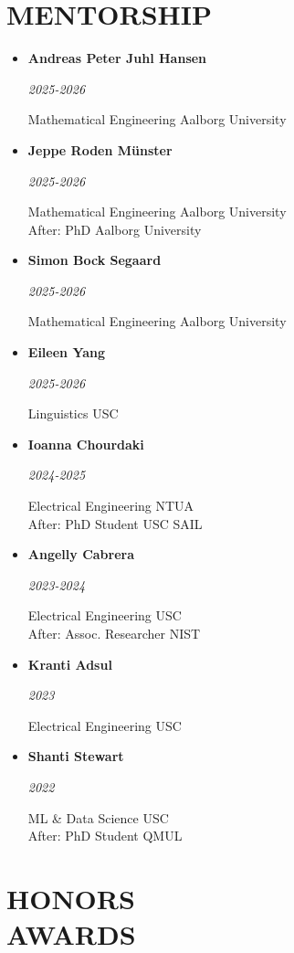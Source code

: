 \documentclass[margin]{res}
\newcommand{\cvheading}[2]{%
  \par\Needspace{4\baselineskip}\noindent
  \parbox[t]{\dimexpr\linewidth-110pt\relax}{\raggedright\bfseries #1}%
  \hfill\parbox[t]{98pt}{\raggedleft\itshape #2}%
  \par\nopagebreak[4]\vspace{-\parskip}\noindent\ignorespaces}
\begin{document}
\begin{resume}
\section{MENTORSHIP}

\begin{itemize}[leftmargin=*]
    \item \cvheading{Andreas Peter Juhl Hansen}{2025-2026}
    Mathematical Engineering \textperiodcentered{} Aalborg University
    \item \cvheading{Jeppe Roden Münster}{2025-2026}
    Mathematical Engineering \textperiodcentered{} Aalborg University \\
    After: PhD \textperiodcentered{} Aalborg University
    \item \cvheading{Simon Bock Segaard}{2025-2026}
    Mathematical Engineering \textperiodcentered{} Aalborg University
    \item \cvheading{Eileen Yang}{2025-2026}
    Linguistics \textperiodcentered{} USC
    \item \cvheading{Ioanna Chourdaki}{2024-2025}
    Electrical Engineering \textperiodcentered{} NTUA \\
    After: PhD Student \textperiodcentered{} USC SAIL
    \item \cvheading{Angelly Cabrera}{2023-2024}
    Electrical Engineering \textperiodcentered{} USC \\
    After: Assoc. Researcher \textperiodcentered{} NIST
    \item \cvheading{Kranti Adsul}{2023}
    Electrical Engineering \textperiodcentered{} USC
    \item \cvheading{Shanti Stewart}{2022}
    ML \& Data Science \textperiodcentered{} USC \\
    After: PhD Student \textperiodcentered{} QMUL
\end{itemize}

\section{HONORS \\ AWARDS}


\end{resume}
\end{document}
